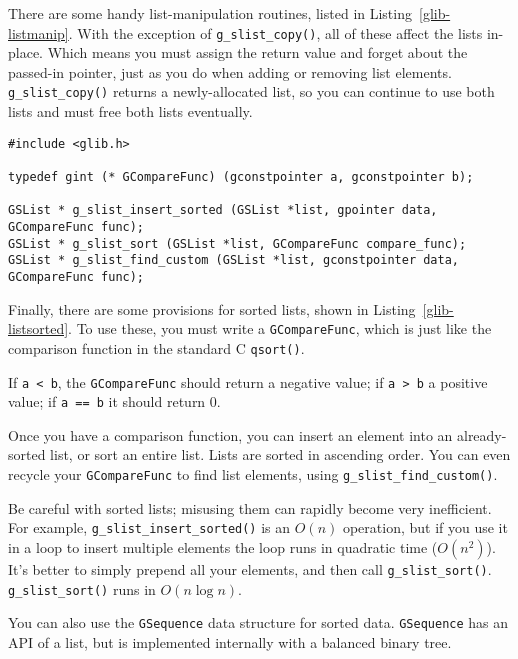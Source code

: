There are some handy list-manipulation routines, listed in Listing~\ref{glib-listmanip}. With the exception of \lstinline{g_slist_copy()}, all of these affect the lists in-place. Which means you must assign the return value and forget about the passed-in pointer, just as you do when adding or removing list elements. \lstinline{g_slist_copy()} returns a newly-allocated list, so you can continue to use both lists and must free both lists eventually.

\begin{lstlisting}[float, caption={Sorted lists}, label=glib-listsorted]
#include <glib.h>

typedef gint (* GCompareFunc) (gconstpointer a, gconstpointer b);

GSList * g_slist_insert_sorted (GSList *list, gpointer data, GCompareFunc func);
GSList * g_slist_sort (GSList *list, GCompareFunc compare_func);
GSList * g_slist_find_custom (GSList *list, gconstpointer data, GCompareFunc func);
\end{lstlisting}

Finally, there are some provisions for sorted lists, shown in Listing~\ref{glib-listsorted}. To use these, you must write a \lstinline{GCompareFunc}, which is just like the comparison function in the standard C \lstinline{qsort()}.

If \lstinline{a < b}, the \lstinline{GCompareFunc} should return a negative value; if \lstinline{a > b} a positive value; if \lstinline{a == b} it should return 0.

Once you have a comparison function, you can insert an element into an already-sorted list, or sort an entire list. Lists are sorted in ascending order. You can even recycle your \lstinline{GCompareFunc} to find list elements, using \lstinline{g_slist_find_custom()}.

Be careful with sorted lists; misusing them can rapidly become very inefficient. For example, \lstinline{g_slist_insert_sorted()} is an $O(n)$ operation, but if you use it in a loop to insert multiple elements the loop runs in quadratic time ($O(n^2)$). It's better to simply prepend all your elements, and then call \lstinline{g_slist_sort()}. \lstinline{g_slist_sort()} runs in $O(n \log n)$.

You can also use the \lstinline{GSequence} data structure for sorted data. \lstinline{GSequence} has an API of a list, but is implemented internally with a balanced binary tree.

%

